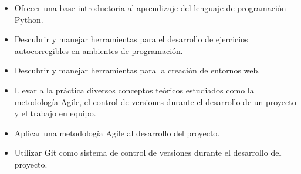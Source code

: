 \begin{itemize}
  \item Ofrecer una base introductoria al aprendizaje del lenguaje de programación Python.
  \item Descubrir y manejar herramientas para el desarrollo de ejercicios autocorregibles en ambientes de programación.
  \item Descubrir y manejar herramientas para la creación de entornos web.
  \item Llevar a la práctica diversos conceptos teóricos estudiados como la metodología Agile, el control de versiones durante el desarrollo de un proyecto y el trabajo en equipo.
  \item Aplicar una metodología Agile al desarrollo del proyecto.
  \item Utilizar Git como sistema de control de versiones durante el desarrollo del proyecto.
 
\end{itemize}